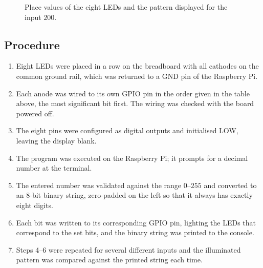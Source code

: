 \documentclass[10pt,a4paper]{article}
\begin{document}
\begin{figure}[H]
\centering
{}
\caption{Place values of the eight LEDs and the pattern displayed for the input $200$.}
\label{fig:bits}
\end{figure}

\subsection{Procedure}
\begin{enumerate}
  \item Eight LEDs were placed in a row on the breadboard with all cathodes on the
        common ground rail, which was returned to a GND pin of the Raspberry Pi.
  \item Each anode was wired to its own GPIO pin in the order given in the table above,
        the most significant bit first. The wiring was checked with the board powered off.
  \item The eight pins were configured as digital outputs and initialised LOW, leaving
        the display blank.
  \item The program was executed on the Raspberry Pi; it prompts for a decimal number
        at the terminal.
  \item The entered number was validated against the range $0$--$255$ and converted to
        an 8-bit binary string, zero-padded on the left so that it always has exactly
        eight digits.
  \item Each bit was written to its corresponding GPIO pin, lighting the LEDs that
        correspond to the set bits, and the binary string was printed to the console.
  \item Steps 4--6 were repeated for several different inputs and the illuminated
        pattern was compared against the printed string each time.
\end{enumerate}
\end{document}
